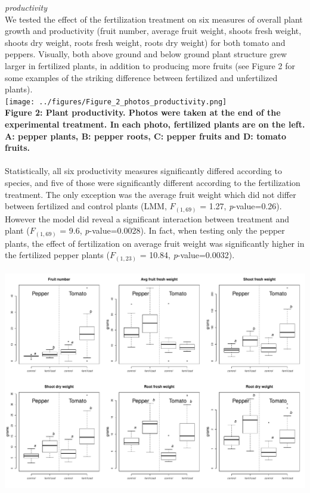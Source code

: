 \documentclass[11pt,]{article}
\begin{document}
\emph{productivity}\\
We tested the effect of the fertilization treatment on six measures of
overall plant growth and productivity (fruit number, average fruit
weight, shoots fresh weight, shoots dry weight, roots fresh weight,
roots dry weight) for both tomato and peppers. Visually, both above
ground and below ground plant structure grew larger in fertilized
plants, in addition to producing more fruits (see Figure 2 for some
examples of the striking difference between fertilized and unfertilized
plants). ~\\
\texttt{[image: ../figures/Figure\_2\_photos\_productivity.png]}\\
\textbf{Figure 2: Plant productivity. Photos were taken at the end of
the experimental treatment. In each photo, fertilized plants are on the
left. A: pepper plants, B: pepper roots, C: pepper fruits and D: tomato
fruits.}\\
\hspace*{0.333em}\\
Statistically, all six productivity measures significantly differed
according to species, and five of those were significantly different
according to the fertilization treatment. The only exception was the
average fruit weight which did not differ between fertilized and control
plants (LMM, \(F_{(1,69)}\) = 1.27, \emph{p}-value=0.26). However the
model did reveal a significant interaction between treatment and plant
(\(F_{(1,69)}\) = 9.6, \emph{p}-value=0.0028). In fact, when testing
only the pepper plants, the effect of fertilization on average fruit
weight was significantly higher in the fertilized pepper plants
(\(F_{(1,23)}\) = 10.84, \emph{p}-value=0.0032).\\
\hspace*{0.333em}\\
\includegraphics[width=6.25000in]{../figures/Figure_3_productivity.pdf}\\
\end{document}

